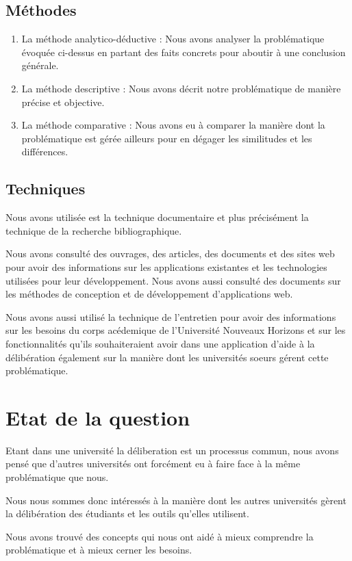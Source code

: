 \subsection{Méthodes}
\begin{enumerate}
    \item La méthode analytico-déductive : Nous avons analyser la problématique évoquée ci-dessus en partant des faits concrets pour aboutir à une conclusion générale.
    \item La méthode descriptive : Nous avons décrit notre problématique de manière précise et objective.
    \item La méthode comparative : Nous avons eu à comparer la manière dont la problématique est gérée ailleurs pour en dégager les similitudes et les différences.
\end{enumerate}

\subsection{Techniques}
Nous avons utilisée est la technique documentaire et
plus précisément la technique de la recherche bibliographique.

Nous avons consulté des ouvrages, des articles, des documents et des sites web
pour avoir des informations sur les applications existantes et les
technologies utilisées pour leur développement. Nous avons aussi
consulté des documents sur les méthodes de conception et de
développement d'applications web.

Nous avons aussi utilisé la technique de l'entretien pour
avoir des informations sur les besoins du corps acédemique de
l'Université Nouveaux Horizons et
sur les fonctionnalités qu'ils souhaiteraient avoir
dans une application d'aide à la délibération également sur la
manière dont les universités soeurs gérent cette problématique.

\section{Etat de la question}\label{sec:etat-de-l-art}
Etant dans une université la déliberation est un processus commun,
nous avons pensé que d'autres universités ont forcément eu à faire face à la même problématique que nous.

Nous nous sommes donc intéressés à la manière dont les autres universités
gèrent la délibération des étudiants et les outils qu'elles utilisent.

Nous avons trouvé des concepts qui nous ont aidé à mieux
comprendre la problématique et à mieux cerner les besoins.

